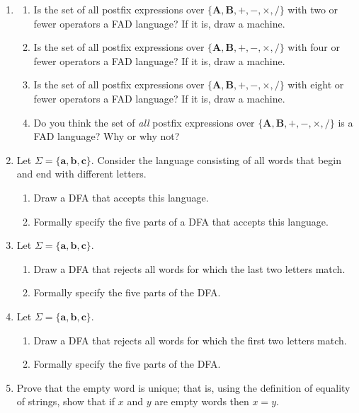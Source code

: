 \begin{enumerate}[{1.}1.]
\item
\begin{enumerate}
\item Is the set of all postfix expressions over $\{\pmb{A},\pmb{B},\pmb{+},
\pmb{-},\pmb{\times},\pmb{/}\}$ with two or fewer operators a FAD language? If it
is, draw a machine.
\item Is the set of all postfix expressions over $\{\pmb{A},\pmb{B},\pmb{+},
\pmb{-},\pmb{\times},\pmb{/}\}$ with four or fewer operators a FAD language? If it
is, draw a machine.
\item Is the set of all postfix expressions over $\{\pmb{A},\pmb{B},\pmb{+},
\pmb{-},\pmb{\times},\pmb{/}\}$ with eight or fewer operators a FAD language? If it
is, draw a machine.
\item Do you think the set of \emph{all} postfix expressions over $\{\pmb{A},\pmb{B},
\pmb{+},\pmb{-},\pmb{\times},\pmb{/}\}$ is a FAD language? Why or why not?
\end{enumerate}

\item Let $\Sigma =\{\pmb{a},\pmb{b},\pmb{c}\}$. Consider the language
consisting of all words that begin and end with different letters.
\begin{enumerate}
\item Draw a DFA that accepts this language.
\item Formally specify the five parts of a DFA that accepts this language.
\end{enumerate}

\item Let $\Sigma =\{\pmb{a},\pmb{b},\pmb{c}\}$.
\begin{enumerate}
\item Draw a DFA that rejects all words for which the last two letters match.
\item Formally specify the five parts of the DFA.
\end{enumerate}

\item Let $\Sigma =\{\pmb{a},\pmb{b},\pmb{c}\}$.
\begin{enumerate}
\item Draw a DFA that rejects all words for which the first two letters match.
\item Formally specify the five parts of the DFA.
\end{enumerate}

\item Prove that the empty word is unique; that is, using the definition of
equality of strings, show that if $x$ and $y$ are empty words then $x = y$.


\end{enumerate}
